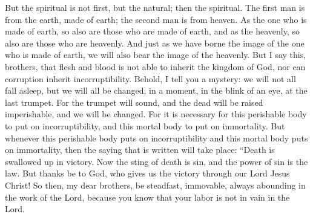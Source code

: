 \begin{biblechapter}
\verse But the spiritual is not first, but the natural; then the spiritual.
\verse The first man is from the earth, made of earth; the second man is from heaven.
\verse As the one who is made of earth, so also are those who are made of earth, and as the heavenly, so also are those who are heavenly.
\verse And just as we have borne the image of the one who is made of earth, we will also bear the image of the heavenly.
\verse But I say this, brothers, that flesh and blood is not able to inherit the kingdom of God, nor can corruption inherit incorruptibility.
\verse Behold, I tell you a mystery: we will not all fall asleep, but we will all be changed,
\verse in a moment, in the blink of an eye, at the last trumpet. For the trumpet will sound, and the dead will be raised imperishable, and we will be changed.
\verse For it is necessary for this perishable body to put on incorruptibility, and this mortal body to put on immortality.
\verse But whenever this perishable body puts on incorruptibility and this mortal body puts on immortality, then the saying that is written will take place:
\verse “Death is swallowed up in victory.
\verse Now the sting of death is sin, and the power of sin is the law.
\verse But thanks be to God, who gives us the victory through our Lord Jesus Christ!
\verse So then, my dear brothers, be steadfast, immovable, always abounding in the work of the Lord, because you know that your labor is not in vain in the Lord.
\end{biblechapter}

